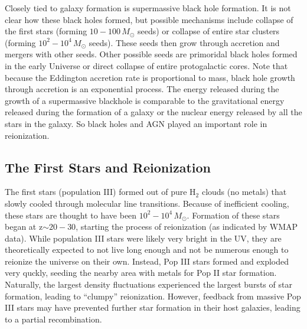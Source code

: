 Closely tied to galaxy formation is supermassive black hole formation.  It is 
not clear how these black holes formed, but possible mechanisms include 
collapse of the first stars (forming $10-100\,M_{\odot}$ seeds) or collapse of 
entire star clusters (forming $10^2-10^4\,M_{\odot}$ seeds).  These 
seeds then grow through accretion and mergers with other seeds.  Other 
possible seeds are primoridal black holes formed in the early Universe or 
direct collapse of entire protogalactic cores.  Note that because the 
Eddington accretion rate is proportional to mass, black hole growth through 
accretion is an exponential process.  The energy released during the 
growth of a supermassive blackhole is comparable to the gravitational 
energy released during the formation of a galaxy or the nuclear energy 
released by all the stars in the galaxy.  So black holes and AGN played an 
important role in reionization.  

\subsection{The First Stars and Reionization}
The first stars (population III) formed out of pure H$_2$ clouds (no metals) 
that slowly cooled through molecular line transitions.  Because of inefficient 
cooling, these stars are thought to have been $10^2-10^4\,M_{\odot}$.  
Formation of these stars began at z$\sim20-30$, starting the process of 
reionization (as indicated by WMAP data).  While population III stars were likely very bright in the UV, they are theoretically
expected to not live long enough and not be numerous enough to reionize the universe on their
own.  Instead, Pop III stars formed and exploded very quckly, seeding the nearby area with
metals for Pop II star formation.
Naturally, the largest density fluctuations experienced the largest bursts of star formation,
leading to ``clumpy'' reionization.  
However, feedback from massive Pop III stars may have prevented further star formation in their 
host galaxies, leading to a partial recombination.


